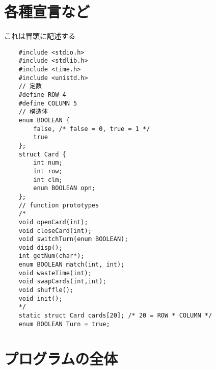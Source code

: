 \documentclass[uplatex,a4paper,11pt,oneside,openany]{jsarticle}
\begin{document}
\begin{comment}
	\section{手番の交代(switchTurn)}
	
	\begin{lstlisting}
		void switchTurn(enum BOOLEAN t){
			Turn = !t;
		}
	\end{lstlisting}
	
	\section{時間稼ぎ(wasteTime)}
	
	開いたカードを見せておく時間
	
	\begin{lstlisting}
		void wasteTime(int sec){
			sleep(sec);
		}
	\end{lstlisting}
\end{comment}

\section{各種宣言など}

これは冒頭に記述する

\begin{lstlisting}
	#include <stdio.h>
	#include <stdlib.h>
	#include <time.h>
	#include <unistd.h>
	// 定数
	#define ROW 4
	#define COLUMN 5
	// 構造体
	enum BOOLEAN {
		false, /* false = 0, true = 1 */
		true
	};
	struct Card {
		int num;
		int row;
		int clm;
		enum BOOLEAN opn;
	};
	// function prototypes
	/*
	void openCard(int);
	void closeCard(int);
	void switchTurn(enum BOOLEAN);
	void disp();
	int getNum(char*);
	enum BOOLEAN match(int, int);
	void wasteTime(int);
	void swapCards(int,int);
	void shuffle();
	void init();
	*/
	static struct Card cards[20]; /* 20 = ROW * COLUMN */
	enum BOOLEAN Turn = true;  
\end{lstlisting}

\newpage

\section{プログラムの全体}


\end{document}
